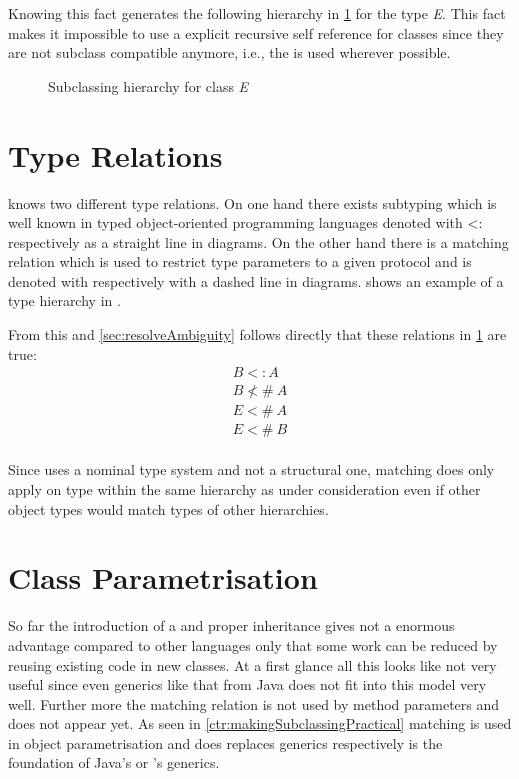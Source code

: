 Knowing this fact generates the following hierarchy in \cref{fig:fixedHierarchy}
for the type \emph{E}. This fact makes it impossible to use a explicit recursive
self reference for classes since they are not subclass compatible anymore, i.e.,
the \mytype is used wherever possible. 

\begin{figure}[h]
	\centering
	\caption{Subclassing hierarchy for class \emph{E}}
	\label{fig:fixedHierarchy}
\end{figure}

\section{Type Relations}
\ooplss knows two different type relations. On one hand there exists
subtyping which is well known in typed object-oriented programming
languages denoted with <: respectively as a straight line in diagrams. On
the other hand there is a matching relation which is used to restrict type
parameters to a given protocol and is denoted with \match respectively
with a dashed line in diagrams.  shows an example
of a type hierarchy in \ooplss.

From this and \cref{sec:resolveAmbiguity} follows directly that these
relations in \cref{fig:fixedHierarchy} are true:
\begin{align*}
B <: A \\
B \nless\!\!\#~A \\
E <\!\!\#~A \\
E <\!\!\#~B \\
\end{align*}

Since \ooplss uses a nominal type system and not a structural one,
matching does only apply on type within the same hierarchy as under
consideration even if other object types would match types of other
hierarchies.

\section{Class Parametrisation}
So far the introduction of a \mytype and proper inheritance gives not a
enormous advantage compared to other languages only that some work can
be reduced by reusing existing code in new classes. At a first glance
all this looks like not very useful since even generics like that from
Java does not fit into this model very well. Further more the matching
relation is not used by method parameters and does not appear yet. As
seen in \cref{ctr:makingSubclassingPractical} matching is used in object
parametrisation and does replaces generics respectively is the foundation
of Java's or \cs's generics.

